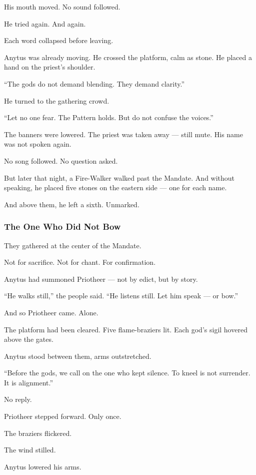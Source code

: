 \documentclass[12pt]{article}
\begin{document}
His mouth moved.  
No sound followed.

He tried again.  
And again.

Each word collapsed before leaving.

Anytus was already moving.  
He crossed the platform, calm as stone.  
He placed a hand on the priest’s shoulder.

 “The gods do not demand blending.  
 They demand clarity.”

He turned to the gathering crowd.

 “Let no one fear.  
 The Pattern holds.  
 But do not confuse the voices.”

The banners were lowered.  
The priest was taken away — still mute.  
His name was not spoken again.

No song followed.  
No question asked.

But later that night, a Fire-Walker walked past the Mandate.  
And without speaking, he placed five stones on the eastern side —  
one for each name.

And above them, he left a sixth.  
Unmarked.

\dotfill

\subsubsection{The One Who Did Not Bow}

They gathered at the center of the Mandate.

Not for sacrifice.  
Not for chant.  
For confirmation.

Anytus had summoned Priotheer — not by edict,  
but by story.

 “He walks still,” the people said.  
 “He listens still.  
 Let him speak — or bow.”

And so Priotheer came.  
Alone.

The platform had been cleared.  
Five flame-braziers lit.  
Each god’s sigil hovered above the gates.

Anytus stood between them, arms outstretched.

 “Before the gods, we call on the one who kept silence.  
 To kneel is not surrender.  
It is alignment.”

No reply.

Priotheer stepped forward.  
Only once.

The braziers flickered.

The wind stilled.

Anytus lowered his arms.
\end{document}
